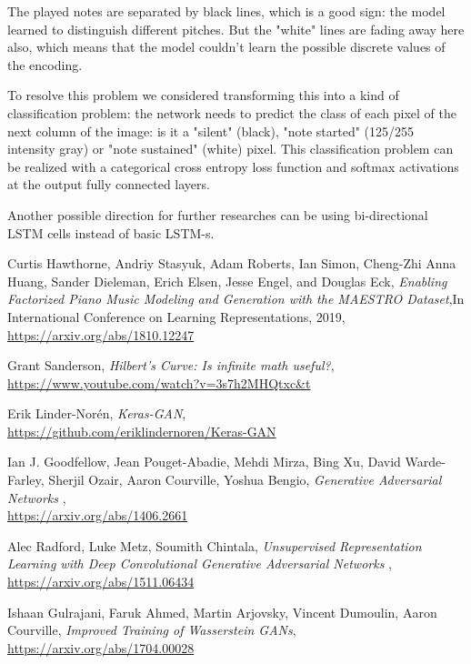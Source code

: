 \documentclass{article}
\begin{document}
The played notes are separated by black lines, which is a good sign: the model learned to distinguish different pitches. But the "white" lines are fading away here also, which means that the model couldn't learn the possible discrete values of the encoding. 

To resolve this problem we considered transforming this into a kind of classification problem: the network needs to predict the class of each pixel of the next column of the image: is it a "silent" (black), "note started" (125/255 intensity gray) or "note sustained" (white) pixel. This classification problem can be realized with a categorical cross entropy loss function and softmax activations at the output fully connected layers. 

Another possible direction for further researches can be using bi-directional LSTM cells instead of basic LSTM-s. 

\small
\newpage

\begin{thebibliography}{bibliography}
	Curtis Hawthorne, Andriy Stasyuk, Adam Roberts, Ian Simon, Cheng-Zhi Anna Huang, Sander Dieleman, Erich Elsen, Jesse Engel, and Douglas Eck, \emph{Enabling Factorized Piano Music Modeling and Generation with the MAESTRO Dataset},In International Conference on Learning Representations, 2019, \\ \url{https://arxiv.org/abs/1810.12247}
	
	Grant Sanderson, \emph{Hilbert's Curve: Is infinite math useful?},\\ \url{https://www.youtube.com/watch?v=3s7h2MHQtxc\&t}
	
	 Erik Linder-Norén, \emph{Keras-GAN}, \\
	\url{https://github.com/eriklindernoren/Keras-GAN}
	
	 Ian J. Goodfellow, Jean Pouget-Abadie, Mehdi Mirza, Bing Xu, David Warde-Farley, Sherjil Ozair, Aaron Courville, Yoshua Bengio, \emph{Generative Adversarial Networks
	}, \\
	\url{https://arxiv.org/abs/1406.2661}
	
	 Alec Radford, Luke Metz, Soumith Chintala, \emph{Unsupervised Representation Learning with Deep Convolutional Generative Adversarial Networks
	}, \\
	\url{https://arxiv.org/abs/1511.06434}
	
	Ishaan Gulrajani, Faruk Ahmed, Martin Arjovsky, Vincent Dumoulin, Aaron Courville, \emph{Improved Training of Wasserstein GANs}, \\
	\url{https://arxiv.org/abs/1704.00028}
\end{thebibliography}
\end{document}
